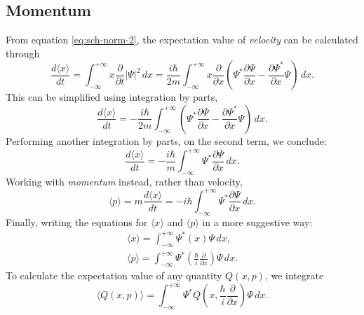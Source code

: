 \documentclass{article}
\begin{document}
\subsection{Momentum}

From equation \eqref{eq:sch-norm-2}, the expectation value of \emph{velocity}
can be calculated through
\begin{equation}
  \frac{d\langle x \rangle}{dt}
  = \int_{-\infty}^{+ \infty} x\frac{\partial}{\partial t}|\Psi|^2 \,dx
  = \frac{i \hbar}{2m} \int_{- \infty}^{+ \infty} x\frac{\partial}{\partial x}
  \left(
    \Psi^*\frac{\partial \Psi}{\partial x} - \frac{\partial \Psi^*}{\partial x}
    \Psi
  \right) \,dx. \label{eq:sch-mom-1}
\end{equation}
This can be simplified using integration by parts,
\begin{equation}
  \frac{d\langle x \rangle}{dt}
  = -\frac{i\hbar}{2m} \int_{-\infty}^{+\infty} \left(
    \Psi^*\frac{\partial \Psi}{\partial x} - \frac{\partial \Psi^*}{\partial x}
    \Psi
  \right) \,dx. \label{eq:sch-mom-2}
\end{equation}
Performing another integration by parts, on the second term, we conclude:
\begin{equation}
  \frac{d\langle x \rangle}{dt}
  = -\frac{i\hbar}{m} \int_{-\infty}^{+\infty} \Psi^*
  \frac{\partial \Psi}{\partial x} \,dx. \label{eq:sch-mom-3}
\end{equation}
Working with \emph{momentum} instead, rather than velocity,
\begin{equation}
  \langle p \rangle
  = m\frac{d \langle x \rangle}{dt}
  = -i\hbar\int_{-\infty}^{+\infty} \Psi^*
  \frac{\partial \Psi}{\partial x} \,dx. \label{eq:sch-mom-4}
\end{equation}
Finally, writing the equations for $\langle x \rangle$ and $\langle p \rangle$
in a more suggestive way:
\begin{gather}
  \langle x \rangle = \int_{-\infty}^{+\infty}
    \Psi^*(x)\Psi
  \,dx, \label{eq:sch-vel} \\
  \langle p \rangle = \int_{-\infty}^{+\infty} \Psi^* \left(
    \frac{\hbar}{i}\frac{\partial}{\partial x}
  \right)\Psi \,dx. \label{eq:sch-mom}
\end{gather}
To calculate the expectation value of any quantity $Q(x, p)$, we integrate
\begin{equation}
  \langle Q(x, p) \rangle = \int_{-\infty}^{+\infty}
    \Psi^*Q\left(x, \frac{\hbar}{i}\frac{\partial}{\partial x}\right)\Psi
  \,dx. \label{eq:sch-qty}
\end{equation}
\end{document}
